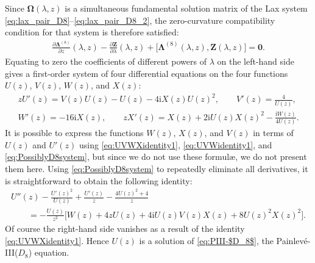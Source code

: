 \documentclass[11pt]{article}
\numberwithin{equation}{section}
\numberwithin{equation}{section}
\newcommand{\ii}{\mathrm{i}}
\begin{document}
Since $\mathbf{\Omega}(\lambda,z)$ is a simultaneous fundamental solution matrix of the Lax system \eqref{eq:lax_pair_D8}--\eqref{eq:lax_pair_D8_2}, the zero-curvature compatibility condition for that system is therefore satisfied:
\begin{gather*}
 \frac{\partial\mathbf{\Lambda}^{(8)}}{\partial z}(\lambda,z)-\frac{\partial\mathbf{Z}}{\partial\lambda}(\lambda,z)+\big[\mathbf{\Lambda}^{(8)}(\lambda,z),\mathbf{Z}(\lambda,z)\big]=\mathbf{0}.
\end{gather*}
Equating to zero the coefficients of different powers of $\lambda$ on the left-hand side gives a first-order system of four differential equations on the four functions $U(z)$, $V(z)$, $W(z)$, and $X(z)$:
\begin{gather}
 zU'(z)=V(z)U(z)-U(z)-4\ii X(z)U(z)^2,\qquad
 V'(z)=\frac{4}{U(z)},\nonumber\\
 W'(z)=-16\ii X(z),\qquad
 zX'(z)=X(z)+2\ii U(z)X(z)^2-\frac{\ii W(z)}{4U(z)}.
 \label{eq:PossiblyD8system}
\end{gather}
It is possible to express the functions $W(z)$, $X(z)$, and $V(z)$ in terms of $U(z)$ and $U'(z)$ using \eqref{eq:UVWXidentity1}, \eqref{eq:UVWidentity1}, and \eqref{eq:PossiblyD8system}, but since we do not use these formul\ae, we do not present them here. Using \eqref{eq:PossiblyD8system} to repeatedly eliminate all derivatives, it is straightforward to obtain the following identity:
\begin{gather*}
 U''(z)-\frac{U'(z)^2}{U(z)}+\frac{U'(z)}{z} -\frac{4U(z)^2+4}{z}\\
 \qquad=-\frac{U(z)}{z^2}\big[ W(z)+4 z U(z) +4 \ii U(z) V(z) X(z) + 8 U(z)^2 X(z)^2\big].
\end{gather*}
Of course the right-hand side vanishes as a result of the identity \eqref{eq:UVWXidentity1}. Hence $U(z)$ is a solution of \eqref{eq:PIII-$D_8$}, the Painlev\'e-III($D_8$) equation.
\end{document}
